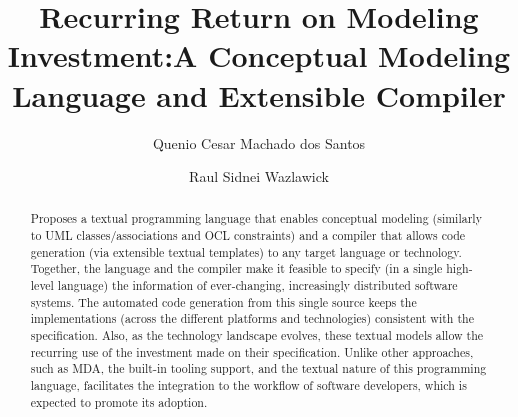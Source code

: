 \documentclass{svproc}
\begin{document}
\mainmatter  %
\title{Recurring Return on Modeling Investment:\newline A Conceptual Modeling Language and Extensible Compiler}
\author{Quenio Cesar Machado dos Santos \and Raul Sidnei Wazlawick}

\maketitle              %

\begin{abstract}
Proposes a textual programming language that enables conceptual modeling
(similarly to UML classes/associations and OCL constraints) and a compiler
that allows code generation (via extensible textual templates) to any target
language or technology. Together, the language and the compiler make it feasible
to specify (in a single high-level language) the information of ever-changing,
increasingly distributed software systems. The automated code generation
from this single source keeps the implementations (across the different platforms
and technologies) consistent with the specification. Also, as the technology landscape
evolves, these textual models allow the recurring use of the investment made on their
specification. Unlike other approaches, such as MDA, the built-in tooling support, and
the textual nature of this programming language, facilitates the integration to the workflow
of software developers, which is expected to promote its adoption.
\end{abstract}
%
%
%
%
\begin{thebibliography}{6}
%
\end{thebibliography}
\end{document}
